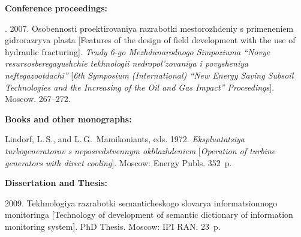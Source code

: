 {{\begin{enumerate}[1.]
\thispagestyle{empty}

\noindent
\textbf{Conference proceedings:}

. 2007. Osobennosti proektirovaniya razrabotki mestorozhdeniy 
s primeneniem gidrorazryva 
plasta [Features of the design of field development with the use of hydraulic fracturing]. 
\textit{Trudy 6-go 
Mezhdu\-na\-rod\-no\-go Simpoziuma ``Novye resursosberegayushchie tekhnologii 
nedropol'zovaniya i povysheniya 
neftegazootdachi''} [\textit{6th  Symposium (International) ``New Energy Saving Subsoil 
Technologies and 
the Increasing of the Oil and Gas Impact'' Proceedings}]. Moscow. 267--272.


\noindent
\textbf{Books and other monographs:}




Lindorf, L.\,S., and L.\,G.~Mamikoniants, eds. 1972. 
\textit{Ekspluatatsiya turbogeneratorov s neposredstvennym 
okhlazhdeniem} [\textit{Operation of turbine generators with direct cooling}]. 
Moscow: Energy Publs. 352~p.










\noindent
\textbf{Dissertation and Thesis:}


 2009. Tekhnologiya razrabotki semanticheskogo 
slovarya informatsionnogo monitoringa [Technology of development of 
semantic dictionary of information monitoring system]. PhD Thesis. Moscow: IPI RAN. 23~p.



\end{enumerate}}}
